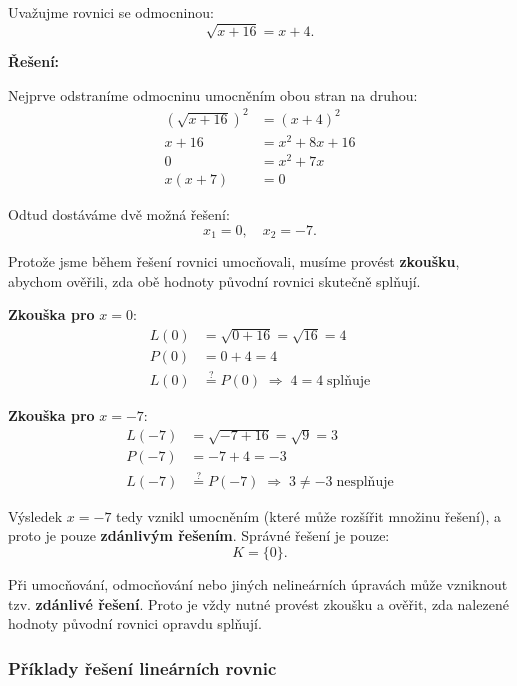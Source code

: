 \documentclass[12pt,a4paper]{article}
\begin{document}
\begin{examplebox}
Uvažujme rovnici se odmocninou:
\[
\sqrt{x + 16} = x + 4.
\]

\textbf{Řešení:}

Nejprve odstraníme odmocninu umocněním obou stran na druhou:
\begin{align*}
(\sqrt{x + 16})^2 &= (x + 4)^2\\
x + 16 &= x^2 + 8x + 16\\
0 &= x^2 + 7x\\
x(x + 7) &= 0
\end{align*}

\noindent
Odtud dostáváme dvě možná řešení:
\[
x_1 = 0, \quad x_2 = -7.
\]

\medskip
Protože jsme během řešení rovnici umocňovali, musíme provést \textbf{zkoušku}, abychom ověřili,
 zda obě hodnoty původní rovnici skutečně splňují.

\medskip
\textbf{Zkouška pro } $x = 0$:
\begin{align*}
L(0) &= \sqrt{0 + 16} = \sqrt{16} = 4\\
P(0) &= 0 + 4 = 4\\
L(0) &\stackrel{?}{=} P(0) \;\Rightarrow\; 4 = 4 \;\text{splňuje}
\end{align*}

\medskip
\textbf{Zkouška pro } $x = -7$:
\begin{align*}
L(-7) &= \sqrt{-7 + 16} = \sqrt{9} = 3\\
P(-7) &= -7 + 4 = -3\\
L(-7) &\stackrel{?}{=} P(-7) \;\Rightarrow\; 3 \neq -3 \;\text{nesplňuje}
\end{align*}

\noindent
Výsledek $x = -7$ tedy vznikl umocněním (které může rozšířit množinu řešení),  
a proto je pouze \textbf{zdánlivým řešením}.  
Správné řešení je pouze:
\[
K = \{0\}.
\]

\begin{notebox}
Při umocňování, odmocňování nebo jiných nelineárních úpravách může vzniknout tzv. \textbf{zdánlivé řešení}.  
Proto je vždy nutné provést zkoušku a ověřit, zda nalezené hodnoty původní rovnici opravdu splňují.
\end{notebox}
\end{examplebox}


\subsubsection*{Příklady řešení lineárních rovnic}
\end{document}
